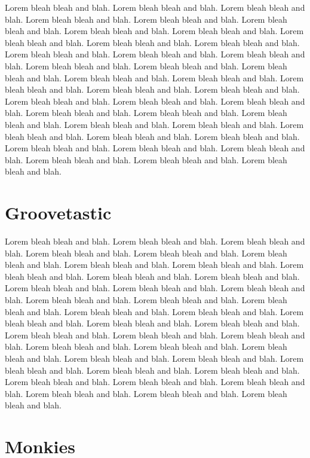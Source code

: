\documentclass[letterpaper,10pt]{article}
\begin{document}
Lorem bleah bleah and blah. Lorem bleah bleah and blah. Lorem bleah
bleah and blah. Lorem bleah bleah and blah. Lorem bleah bleah and
blah. Lorem bleah bleah and blah. Lorem bleah bleah and blah. Lorem
bleah bleah and blah. Lorem bleah bleah and blah. Lorem bleah bleah
and blah. Lorem bleah bleah and blah. Lorem bleah bleah and blah.
Lorem bleah bleah and blah. Lorem bleah bleah and blah. Lorem bleah
bleah and blah. Lorem bleah bleah and blah. Lorem bleah bleah and
blah. Lorem bleah bleah and blah. Lorem bleah bleah and blah. Lorem
bleah bleah and blah. Lorem bleah bleah and blah. Lorem bleah bleah
and blah. Lorem bleah bleah and blah. Lorem bleah bleah and blah.
Lorem bleah bleah and blah. Lorem bleah bleah and blah. Lorem bleah
bleah and blah. Lorem bleah bleah and blah. Lorem bleah bleah and
blah. Lorem bleah bleah and blah. Lorem bleah bleah and blah. Lorem
bleah bleah and blah. Lorem bleah bleah and blah. Lorem bleah bleah
and blah. Lorem bleah bleah and blah. Lorem bleah bleah and blah.
Lorem bleah bleah and blah. Lorem bleah bleah and blah. Lorem bleah
bleah and blah.

\section{ Groovetastic}

Lorem bleah bleah and blah. Lorem bleah bleah and blah. Lorem bleah
bleah and blah. Lorem bleah bleah and blah. Lorem bleah bleah and
blah. Lorem bleah bleah and blah. Lorem bleah bleah and blah. Lorem
bleah bleah and blah. Lorem bleah bleah and blah. Lorem bleah bleah
and blah. Lorem bleah bleah and blah. Lorem bleah bleah and blah.
Lorem bleah bleah and blah. Lorem bleah bleah and blah. Lorem bleah
bleah and blah. Lorem bleah bleah and blah. Lorem bleah bleah and
blah. Lorem bleah bleah and blah. Lorem bleah bleah and blah. Lorem
bleah bleah and blah. Lorem bleah bleah and blah. Lorem bleah bleah
and blah. Lorem bleah bleah and blah. Lorem bleah bleah and blah.
Lorem bleah bleah and blah. Lorem bleah bleah and blah. Lorem bleah
bleah and blah. Lorem bleah bleah and blah. Lorem bleah bleah and
blah. Lorem bleah bleah and blah. Lorem bleah bleah and blah. Lorem
bleah bleah and blah. Lorem bleah bleah and blah. Lorem bleah bleah
and blah. Lorem bleah bleah and blah. Lorem bleah bleah and blah.
Lorem bleah bleah and blah. Lorem bleah bleah and blah. Lorem bleah
bleah and blah.

\section{Monkies}
\end{document}
